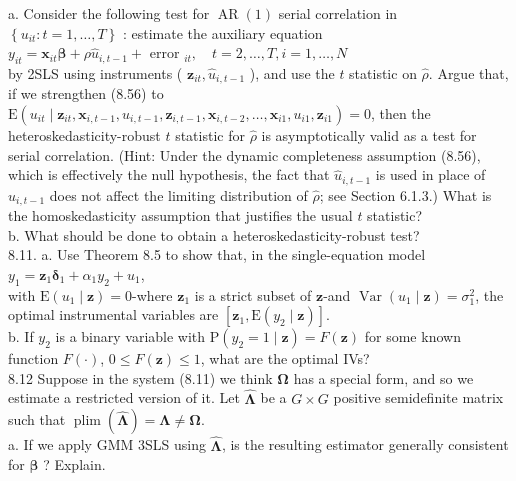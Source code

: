 \documentclass[10pt]{article}
\begin{document}
a. Consider the following test for $\operatorname{AR}(1)$ serial correlation in $\left\{u_{i t}: t=1, \ldots, T\right\}$ : estimate the auxiliary equation\\
$y_{i t}=\mathbf{x}_{i t} \boldsymbol{\beta}+\rho \hat{u}_{i, t-1}+$ error $_{i t}, \quad t=2, \ldots, T, i=1, \ldots, N$\\
by 2SLS using instruments ( $\mathbf{z}_{i t}, \hat{u}_{i, t-1}$ ), and use the $t$ statistic on $\hat{\rho}$. Argue that, if we strengthen (8.56) to $\mathrm{E}\left(u_{i t} \mid \mathbf{z}_{i t}, \mathbf{x}_{i, t-1}, u_{i, t-1}, \mathbf{z}_{i, t-1}, \mathbf{x}_{i, t-2}, \ldots, \mathbf{x}_{i 1}, u_{i 1}, \mathbf{z}_{i 1}\right)=0$, then the heteroskedasticity-robust $t$ statistic for $\hat{\rho}$ is asymptotically valid as a test for serial correlation. (Hint: Under the dynamic completeness assumption (8.56), which is effectively the null hypothesis, the fact that $\hat{u}_{i, t-1}$ is used in place of $u_{i, t-1}$ does not affect the limiting distribution of $\hat{\rho}$; see Section 6.1.3.) What is the homoskedasticity assumption that justifies the usual $t$ statistic?\\
b. What should be done to obtain a heteroskedasticity-robust test?\\
8.11. a. Use Theorem 8.5 to show that, in the single-equation model\\
$y_{1}=\mathbf{z}_{1} \boldsymbol{\delta}_{1}+\alpha_{1} y_{2}+u_{1}$,\\
with $\mathrm{E}\left(u_{1} \mid \mathbf{z}\right)=0$-where $\mathbf{z}_{1}$ is a strict subset of $\mathbf{z}$-and $\operatorname{Var}\left(u_{1} \mid \mathbf{z}\right)=\sigma_{1}^{2}$, the optimal instrumental variables are $\left[\mathbf{z}_{1}, \mathrm{E}\left(y_{2} \mid \mathbf{z}\right)\right]$.\\
b. If $y_{2}$ is a binary variable with $\mathrm{P}\left(y_{2}=1 \mid \mathbf{z}\right)=F(\mathbf{z})$ for some known function $F(\cdot)$, $0 \leq F(\mathbf{z}) \leq 1$, what are the optimal IVs?\\
8.12 Suppose in the system (8.11) we think $\boldsymbol{\Omega}$ has a special form, and so we estimate a restricted version of it. Let $\hat{\boldsymbol{\Lambda}}$ be a $G \times G$ positive semidefinite matrix such that $\operatorname{plim}(\hat{\boldsymbol{\Lambda}})=\boldsymbol{\Lambda} \neq \boldsymbol{\Omega}$.\\
a. If we apply GMM 3SLS using $\hat{\boldsymbol{\Lambda}}$, is the resulting estimator generally consistent for $\boldsymbol{\beta}$ ? Explain.\\
\end{document}
